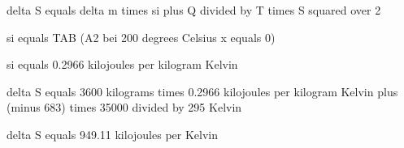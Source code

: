 delta S equals delta m times si plus Q divided by T times S squared over 2

si equals TAB (A2 bei 200 degrees Celsius x equals 0)

si equals 0.2966 kilojoules per kilogram Kelvin

delta S equals 3600 kilograms times 0.2966 kilojoules per kilogram Kelvin plus (minus 683) times 35000 divided by 295 Kelvin

delta S equals 949.11 kilojoules per Kelvin